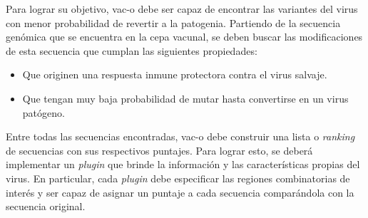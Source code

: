 \documentclass[10pt,a4paper]{article}
\begin{document}
    Para lograr su objetivo, vac-o debe ser capaz de encontrar las variantes del virus con menor probabilidad de revertir a la patogenia. Partiendo de la secuencia gen\'omica que se encuentra en la cepa vacunal, se deben buscar las modificaciones de esta secuencia que cumplan las siguientes propiedades:
    \begin{itemize}
      \item Que originen una respuesta inmune protectora contra el virus salvaje.
      \item Que tengan muy baja probabilidad de mutar hasta convertirse en un virus pat\'ogeno.
    \end{itemize}
    
    Entre todas las secuencias encontradas, vac-o debe construir una lista o \textit{ranking} de secuencias con sus respectivos puntajes. Para lograr esto, se deber\'a implementar un \textit{plugin} que brinde la informaci\'on y las caracter\'isticas propias del virus. En particular, cada \textit{plugin} debe especificar las regiones combinatorias de inter\'es y ser capaz de asignar un puntaje a cada secuencia compar\'andola con la secuencia original. 
\end{document}
